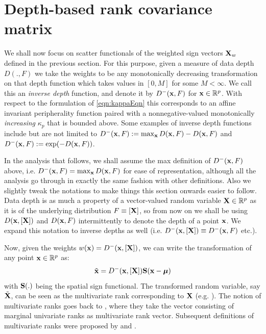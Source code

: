 \section{Depth-based rank covariance matrix} \label{section:dcmSection}

We shall now focus on scatter functionals of the weighted sign vectors ${\mathbf{X}}_w$ defined in the previous section. For this purpose, given a measure of data depth $D(.,F)$ we take the weights to be any monotonically decreasing transformation on that depth function which takes values in $[0,M]$ for some $M < \infty$. We call this an \textit{inverse depth} function, and denote it by $D^- ({\bf{x}}, F)$ for ${\bf{x}} \in {\mathbb{R}}^p$. With respect to the formulation of \ref{eqn:kappaEqn} this corresponds to an affine invariant peripherality function paired with a nonnegative-valued monotonically \textit{increasing} $\kappa_p$ that is bounded above. Some examples of inverse depth functions include but are not limited to $D^-({\bf{x}}, F) := \max_{\bf{x}} D({\bf{x}}, F) - D({\bf{x}}, F)$ and $D^-({\bf{x}}, F) := \exp(-D({\bf{x}}, F))$.

In the analysis that follows, we shall assume the max definition of $D^-({\bf{x}}, F)$ above, i.e. $D^-({\bf{x}}, F) = \max_{\bf{x}} D({\bf{x}}, F)$ for ease of representation, although all the analysis go through in exactly the same fashion with other definitions. Also we slightly tweak the notations to make things this section onwards easier to follow.%
 Data depth is as much a property of a vector-valued random variable ${\mathbf{X}} \in \mathbb{R}^p$ as it is of the underlying distribution $F \equiv [{\mathbf{X}}]$, so from now on we shall be using $D( {\bf{x}}, [{\mathbf{X}}])$ and $D({\bf{x}}, F)$ intermittently to denote the depth of a point ${\bf{x}}$. We expand this notation to inverse depths as well (i.e. $D^- ({\bf{x}}, [{\mathbf{X}}]) \equiv D^- ({\bf{x}}, F)$ etc.).

Now, given the weights $w ({\bf{x}}) = D^- ({\bf{x}}, [{\mathbf{X}}])$, we can write the transformation of any point ${\bf{x}} \in {\mathbb{R}}^p$ as:
%
\begin{align}
\tilde {{\bf{x}}} = D^- ({\bf{x}}, [{\mathbf{X}}]) {\mathbf{S}}({\bf{x}} - {\boldsymbol{\mu}})
\end{align}
%
with ${\mathbf{S}}(.)$ being the spatial sign functional. The transformed random variable, say $\tilde {{\mathbf{X}}}$, can be seen as the multivariate rank corresponding to ${\mathbf{X}}$ (e.g. \cite{serfling2006}). The notion of multivariate ranks goes back to \cite{PuriSenBook}, where they take the vector consisting of marginal univariate ranks as multivariate rank vector. Subsequent definitions of multivariate ranks were proposed by \cite{MottonenOja95,HallinPaindaveine02} and \cite{Chernozhukov17}.

